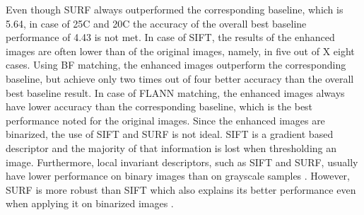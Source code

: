 \documentclass[draft,final]{vutinfth} %
\begin{document}
Even though SURF always outperformed the corresponding baseline, which is 5.64, in case of 25C and 20C the accuracy of the overall best baseline performance of 4.43 is not met.
In case of SIFT, the results of the enhanced images are often lower than of the original images, namely, in five out of X  eight cases.
Using BF matching, the enhanced images outperform the corresponding baseline, but achieve only two times out of four better accuracy than the overall best baseline result.
In case of FLANN matching, the enhanced images always have lower accuracy than the corresponding baseline, which is the best performance noted for the original images. 
Since the enhanced images are binarized, the use of SIFT and SURF is not ideal.
SIFT is a gradient based descriptor and the majority of that information is lost when thresholding an image.
Furthermore, local invariant descriptors, such as SIFT and SURF, usually have lower performance on binary images than on grayscale samples \cite{wang2017manifold}.
However, SURF is more robust than SIFT which also explains its better performance even when applying it on binarized images \cite{bay2006surf}. 

\end{document}
